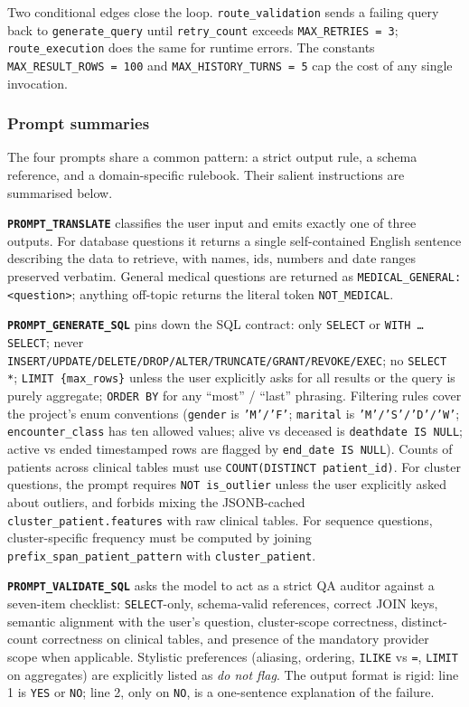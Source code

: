 Two conditional edges close the loop. \texttt{route\_validation} sends a failing query back to \texttt{generate\_query} until \texttt{retry\_count} exceeds \texttt{MAX\_RETRIES = 3}; \texttt{route\_execution} does the same for runtime errors. The constants \texttt{MAX\_RESULT\_ROWS = 100} and \texttt{MAX\_HISTORY\_TURNS = 5} cap the cost of any single invocation.

\subsubsection*{Prompt summaries}

The four prompts share a common pattern: a strict output rule, a schema reference, and a domain-specific rulebook. Their salient instructions are summarised below.

\textbf{\texttt{PROMPT\_TRANSLATE}} classifies the user input and emits exactly one of three outputs. For database questions it returns a single self-contained English sentence describing the data to retrieve, with names, ids, numbers and date ranges preserved verbatim. General medical questions are returned as \texttt{MEDICAL\_GENERAL: <question>}; anything off-topic returns the literal token \texttt{NOT\_MEDICAL}.

\textbf{\texttt{PROMPT\_GENERATE\_SQL}} pins down the SQL contract: only \texttt{SELECT} or \texttt{WITH \dots SELECT}; never \texttt{INSERT/UPDATE/DELETE/DROP/ALTER/TRUNCATE/GRANT/REVOKE/EXEC}; no \texttt{SELECT *}; \texttt{LIMIT \{max\_rows\}} unless the user explicitly asks for all results or the query is purely aggregate; \texttt{ORDER BY} for any ``most'' / ``last'' phrasing. Filtering rules cover the project's enum conventions (\texttt{gender} is \texttt{'M'/'F'}; \texttt{marital} is \texttt{'M'/'S'/'D'/'W'}; \texttt{encounter\_class} has ten allowed values; alive vs deceased is \texttt{deathdate IS NULL}; active vs ended timestamped rows are flagged by \texttt{end\_date IS NULL}). Counts of patients across clinical tables must use \texttt{COUNT(DISTINCT patient\_id)}. For cluster questions, the prompt requires \texttt{NOT is\_outlier} unless the user explicitly asked about outliers, and forbids mixing the JSONB-cached \texttt{cluster\_patient.features} with raw clinical tables. For sequence questions, cluster-specific frequency must be computed by joining \texttt{prefix\_span\_patient\_pattern} with \texttt{cluster\_patient}.

\textbf{\texttt{PROMPT\_VALIDATE\_SQL}} asks the model to act as a strict QA auditor against a seven-item checklist: \texttt{SELECT}-only, schema-valid references, correct JOIN keys, semantic alignment with the user's question, cluster-scope correctness, distinct-count correctness on clinical tables, and presence of the mandatory provider scope when applicable. Stylistic preferences (aliasing, ordering, \texttt{ILIKE} vs \texttt{=}, \texttt{LIMIT} on aggregates) are explicitly listed as \emph{do not flag}. The output format is rigid: line 1 is \texttt{YES} or \texttt{NO}; line 2, only on \texttt{NO}, is a one-sentence explanation of the failure.

